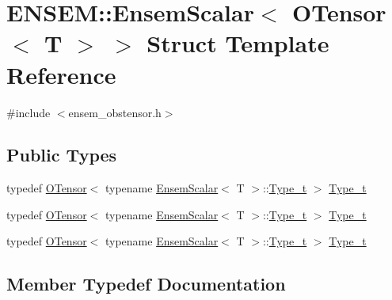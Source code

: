 \hypertarget{structENSEM_1_1EnsemScalar_3_01OTensor_3_01T_01_4_01_4}{}\section{E\+N\+S\+EM\+:\+:Ensem\+Scalar$<$ O\+Tensor$<$ T $>$ $>$ Struct Template Reference}
\label{structENSEM_1_1EnsemScalar_3_01OTensor_3_01T_01_4_01_4}


{\ttfamily \#include $<$ensem\+\_\+obstensor.\+h$>$}

\subsection*{Public Types}
\begin{DoxyCompactItemize}
\item 
typedef \mbox{\hyperlink{classENSEM_1_1OTensor}{O\+Tensor}}$<$ typename \mbox{\hyperlink{structENSEM_1_1EnsemScalar}{Ensem\+Scalar}}$<$ T $>$\+::\mbox{\hyperlink{structENSEM_1_1EnsemScalar_3_01OTensor_3_01T_01_4_01_4_ac7c2eed82696db6f601281499248ff83}{Type\+\_\+t}} $>$ \mbox{\hyperlink{structENSEM_1_1EnsemScalar_3_01OTensor_3_01T_01_4_01_4_ac7c2eed82696db6f601281499248ff83}{Type\+\_\+t}}
\item 
typedef \mbox{\hyperlink{classENSEM_1_1OTensor}{O\+Tensor}}$<$ typename \mbox{\hyperlink{structENSEM_1_1EnsemScalar}{Ensem\+Scalar}}$<$ T $>$\+::\mbox{\hyperlink{structENSEM_1_1EnsemScalar_3_01OTensor_3_01T_01_4_01_4_ac7c2eed82696db6f601281499248ff83}{Type\+\_\+t}} $>$ \mbox{\hyperlink{structENSEM_1_1EnsemScalar_3_01OTensor_3_01T_01_4_01_4_ac7c2eed82696db6f601281499248ff83}{Type\+\_\+t}}
\item 
typedef \mbox{\hyperlink{classENSEM_1_1OTensor}{O\+Tensor}}$<$ typename \mbox{\hyperlink{structENSEM_1_1EnsemScalar}{Ensem\+Scalar}}$<$ T $>$\+::\mbox{\hyperlink{structENSEM_1_1EnsemScalar_3_01OTensor_3_01T_01_4_01_4_ac7c2eed82696db6f601281499248ff83}{Type\+\_\+t}} $>$ \mbox{\hyperlink{structENSEM_1_1EnsemScalar_3_01OTensor_3_01T_01_4_01_4_ac7c2eed82696db6f601281499248ff83}{Type\+\_\+t}}
\end{DoxyCompactItemize}


\subsection{Member Typedef Documentation}
\mbox{\label{structENSEM_1_1EnsemScalar_3_01OTensor_3_01T_01_4_01_4_ac7c2eed82696db6f601281499248ff83}} 
